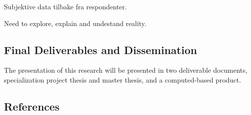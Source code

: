 Subjektive data tilbake fra respondenter. 



Need to explore, explain and undestand reality.



\subsection*{Final Deliverables and Dissemination}

The presentation of this research will be presented in two deliverable documents, specialization project thesis and master thesis, and a computed-based product\cite{forskerhaandboken}.

\subsection*{References}
	
	 

